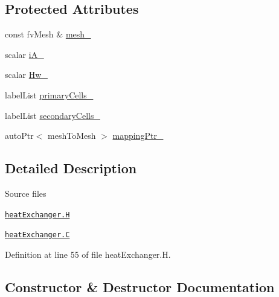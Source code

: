 \subsection*{Protected Attributes}
\begin{DoxyCompactItemize}
\item 
const fv\+Mesh \& \hyperlink{classFoam_1_1heatExchanger_a23edeeeecebcef11921a33dd5d990570}{mesh\+\_\+}
\item 
scalar \hyperlink{classFoam_1_1heatExchanger_ab140fb867465b745d81c3603d93a1ef3}{i\+A\+\_\+}
\item 
scalar \hyperlink{classFoam_1_1heatExchanger_a82781ead8c036e7736578c2047b9c3f4}{Hw\+\_\+}
\item 
label\+List \hyperlink{classFoam_1_1heatExchanger_a6ea409210e15fc6e9e5437736f6b1fa9}{primary\+Cells\+\_\+}
\item 
label\+List \hyperlink{classFoam_1_1heatExchanger_a9d38251d8c4019c88acb6406ca10a840}{secondary\+Cells\+\_\+}
\item 
auto\+Ptr$<$ mesh\+To\+Mesh $>$ \hyperlink{classFoam_1_1heatExchanger_a123fd6cbf85f0e10cc3e6e43836eacba}{mapping\+Ptr\+\_\+}
\end{DoxyCompactItemize}


\subsection{Detailed Description}
\begin{DoxyParagraph}{Source files}

\begin{DoxyItemize}
\item \href{../../../home/carlo/data/GeN-Foam/GeN-Foam_ffn/GeN-Foam/GeN-Foam/classes/thermalHydraulics/src/phaseModels/structureModels/heatExchanger/heatExchanger.H}{\tt heat\+Exchanger.\+H} 
\item \href{../../../home/carlo/data/GeN-Foam/GeN-Foam_ffn/GeN-Foam/GeN-Foam/classes/thermalHydraulics/src/phaseModels/structureModels/heatExchanger/heatExchanger.C}{\tt heat\+Exchanger.\+C} 
\end{DoxyItemize}
\end{DoxyParagraph}


Definition at line 55 of file heat\+Exchanger.\+H.



\subsection{Constructor \& Destructor Documentation}
\mbox{\label{classFoam_1_1heatExchanger_aab7f6e7f7cc3dd809defbc4ad9bb5cff}} 
